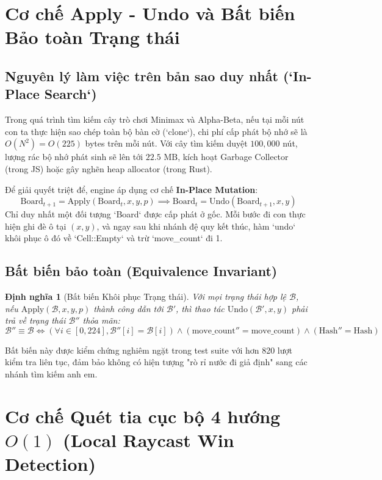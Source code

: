 \documentclass[11pt,a4paper]{report}
\newtheorem{definition}{Định nghĩa}[chapter]
\begin{document}
\section{Cơ chế Apply - Undo và Bất biến Bảo toàn Trạng thái}

\subsection{Nguyên lý làm việc trên bản sao duy nhất (`In-Place Search`)}
Trong quá trình tìm kiếm cây trò chơi Minimax và Alpha-Beta, nếu tại mỗi nút con ta thực hiện sao chép toàn bộ bàn cờ (`clone`), chi phí cấp phát bộ nhớ sẽ là $O(N^2) = O(225)$ bytes trên mỗi nút. Với cây tìm kiếm duyệt $100{,}000$ nút, lượng rác bộ nhớ phát sinh sẽ lên tới $22.5\text{ MB}$, kích hoạt Garbage Collector (trong JS) hoặc gây nghẽn heap allocator (trong Rust).

Để giải quyết triệt để, engine áp dụng cơ chế \textbf{In-Place Mutation}:
\begin{equation}
    \text{Board}_{t+1} = \text{Apply}(\text{Board}_t, x, y, p) \implies \text{Board}_t = \text{Undo}(\text{Board}_{t+1}, x, y)
\end{equation}
Chỉ duy nhất một đối tượng `Board` được cấp phát ở gốc. Mỗi bước đi con thực hiện ghi đè ô tại $(x, y)$, và ngay sau khi nhánh đệ quy kết thúc, hàm `undo` khôi phục ô đó về `Cell::Empty` và trừ `move\_count` đi 1.

\subsection{Bất biến bảo toàn (Equivalence Invariant)}
\begin{definition}[Bất biến Khôi phục Trạng thái]
Với mọi trạng thái hợp lệ $\mathcal{B}$, nếu $\text{Apply}(\mathcal{B}, x, y, p)$ thành công dẫn tới $\mathcal{B}'$, thì thao tác $\text{Undo}(\mathcal{B}', x, y)$ phải trả về trạng thái $\mathcal{B}''$ thỏa mãn:
\begin{equation}
    \mathcal{B}'' \equiv \mathcal{B} \iff (\forall i \in [0, 224], \mathcal{B}''[i] = \mathcal{B}[i]) \land (\text{move\_count}'' = \text{move\_count}) \land (\text{Hash}'' = \text{Hash})
\end{equation}
\end{definition}
Bất biến này được kiểm chứng nghiêm ngặt trong test suite với hơn 820 lượt kiểm tra liên tục, đảm bảo không có hiện tượng "rò rỉ nước đi giả định" sang các nhánh tìm kiếm anh em.

\section{Cơ chế Quét tia cục bộ 4 hướng $O(1)$ (Local Raycast Win Detection)}
\end{document}
